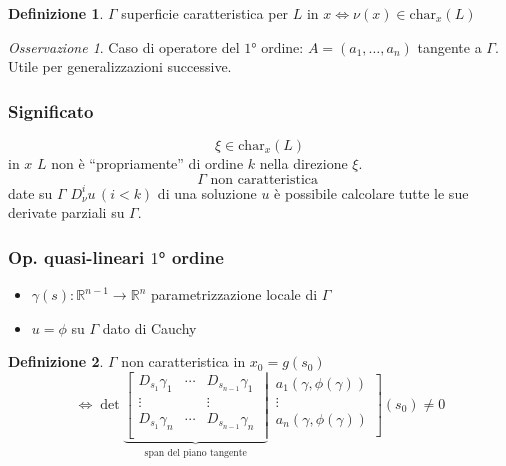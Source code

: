\documentclass[serif,notheorems]{beamer}
\theoremstyle{definition} %
\newtheorem{definition}{Definizione}[section] %
\theoremstyle{remark}
\newtheorem*{remark}{Osservazione}
\begin{document}
\begin{frame}
\begin{definition}
$\Gamma$ superficie caratteristica per $L$ in $x \iff \nu(x) \in\text{char}_x (L)$
\end{definition}
\begin{remark}
Caso di operatore del $1$° ordine: $A=(a_1,\ldots ,a_n)$ tangente a $\Gamma$.\\
Utile per generalizzazioni successive.
\end{remark}
\end{frame}

\begin{frame}
\frametitle{Significato}
$$\xi \in \text{char}_x (L)$$
in $x$ $L$ non è ``propriamente'' di ordine $k$ nella direzione $\xi$.
\vspace{5mm}
$$\Gamma \text{ non caratteristica }$$ 
date su $\Gamma$ $D^i_\nu u \,(i<k)$ di una soluzione $u$
è possibile calcolare tutte le sue derivate parziali su $\Gamma$.
\end{frame}

\begin{frame}
\frametitle{Op. quasi-lineari $1$° ordine}
\begin{itemize}
\item $\gamma (s): \mathbb{R}^{n-1}\rightarrow \mathbb{R}^n$ parametrizzazione locale di $\Gamma$
\item $u = \phi$ su $\Gamma$ dato di Cauchy
\end{itemize}
\begin{definition}
$\Gamma$ non caratteristica in $x_0=g(s_0)$\\
\begin{equation*}
\iff \det
\underbrace{
\left[
\begin{matrix}
D_{s_1}\gamma_1 & \cdots & D_{s_{n-1}}\gamma_1 \\
\vdots &  & \vdots \\
D_{s_1}\gamma_n & \cdots & D_{s_{n-1}}\gamma_n \\
\end{matrix}\;\right|}_{\text{span del piano tangente}} \,
\left.
\begin{matrix}
a_1(\gamma, \phi(\gamma))\\
\vdots\\
a_n(\gamma, \phi(\gamma))\\
\end{matrix}\right] (s_0) \neq 0
\end{equation*}
\end{definition}
\end{frame}
\end{document}
